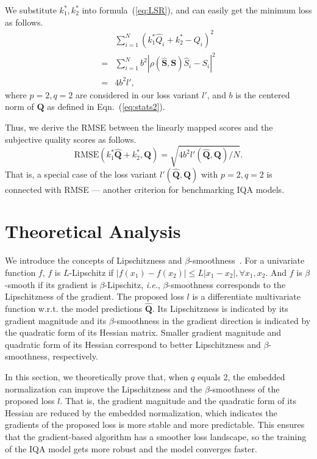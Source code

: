 \documentclass[sigconf]{acmart}
\begin{document}
We substitute $k_1^*,k_2^*$ into formula~(\ref{eq:LSR}), and can easily get the minimum loss as follows.
\begin{align}
    &\sum_{i=1}^N(k_1^*\hat{Q}_i+k_2^*-Q_i)^2\nonumber\\
    =&\sum_{i=1}^N b^2 |\rho(\hat{\mathbf{S}}, {\mathbf{S}})\hat{S}_{i}-{S}_{i}|^2\nonumber\\
    =& 4 b^2 l',\nonumber
\end{align}
where $p=2, q=2$ are considered in our loss variant $l'$, and $b$ is the centered norm of $\mathbf{Q}$ as defined in Eqn.~(\ref{eq:stats2}). 

Thus, we derive the RMSE between the linearly mapped scores and the subjective quality scores as follows.
\begin{equation}
    \mathrm{RMSE}(k_1^*\hat{\mathbf{Q}}+k_2^*, \mathbf{Q}) = \sqrt{4b^2l'(\hat{\mathbf{Q}}, \mathbf{Q})/N}.
\end{equation}
That is, a special case of the loss variant $l'(\hat{\mathbf{Q}}, \mathbf{Q})$ with $p=2, q=2$ is connected with RMSE --- another criterion for benchmarking IQA models.

\section{Theoretical Analysis}
We introduce the concepts of Lipschitzness and $\beta$-smoothness~\cite{nesterov2013introductory}. 
For a univariate function $f$, $f$ is $L$-Lipschitz if $|f(x_1)-f(x_2)| \le L|x_1-x_2|, \forall x_1, x_2$. 
And $f$ is $\beta$-smooth if its gradient is $\beta$-Lipschitz, \textit{i.e.}, $\beta$-smoothness corresponds to the Lipschitzness of the gradient. 
The proposed loss $l$ is a differentiate multivariate function w.r.t. the model predictions $\hat{\mathbf{Q}}$.
Its Lipschitzness is indicated by its gradient magnitude and its $\beta$-smoothness in the gradient direction is indicated by the quadratic form of its Hessian matrix. 
Smaller gradient magnitude and quadratic form of its Hessian correspond to better Lipschitzness and $\beta$-smoothness, respectively.

In this section, we theoretically prove that, when $q$ equals 2, the embedded normalization can improve the Lipschitzness and the $\beta$-smoothness of the proposed loss $l$. That is, the gradient magnitude and the quadratic form of its Hessian are reduced by the embedded normalization, which indicates the gradients of the proposed loss is more stable and more predictable.
This ensures that the gradient-based algorithm has a smoother loss landscape, so the training of the IQA model gets more robust and the model converges faster.
\end{document}
